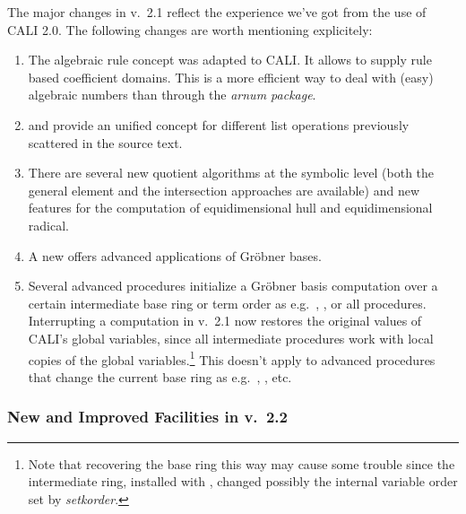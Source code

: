 The major changes in v.\ 2.1 reflect the experience we've got from the
use of CALI 2.0. The following changes are worth mentioning
explicitely:
\begin{enumerate}
\item The algebraic rule concept was adapted to CALI. It allows to
supply rule based coefficient domains. This is a more efficient way
to deal with (easy) algebraic numbers than through the \emph{arnum
package}.

\item {} and  provide an unified
concept for different list operations previously scattered in the
source text.

\item There are several new quotient algorithms at the symbolic level
(both the general element and the intersection approaches are
available) and new features for the computation of equidimensional
hull and equidimensional radical.

\item A new  offers advanced applications of Gr\"obner
bases.

\item Several advanced procedures initialize a Gr\"obner basis computation
over a certain intermediate base ring or term order as e.g.\
, ,  or all
 procedures. Interrupting a computation in
v.\ 2.1 now restores the original values of CALI's global variables,
since all intermediate procedures work with local copies of
the global variables.\footnote{Note that recovering the base
ring this way may cause some trouble since the intermediate ring,
installed with \ind{setring}, changed possibly the internal variable
order set by \emph{setkorder}.} This doesn't apply to advanced
procedures that change the current base ring as e.g.\ ,
\ind{preimage}, \ind{sym} etc.

\end{enumerate}

\subsubsection{New and Improved Facilities in v.\ 2.2}

